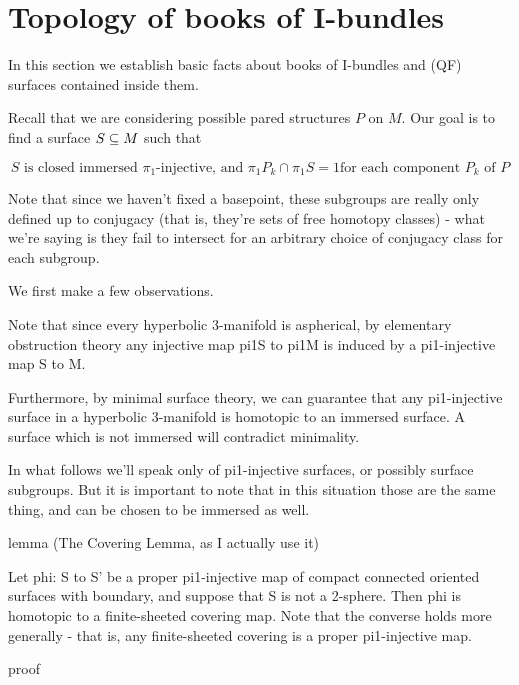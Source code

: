 \section{Topology of books of I-bundles}

In this section we establish basic facts about books of I-bundles and (QF)
surfaces contained inside them.

Recall that we are considering possible pared structures $P$ on $M$. Our goal
is to find a surface $S \subseteq M$ such that

\begin{equation}\label{E:qf}
S \text{ is closed immersed $\pi_1$-injective, and $\pi_1P_k \cap \pi_1S = 1$
for each component $P_k$ of $P$} \tag{QF}
\end{equation}

Note that since we haven't fixed a basepoint, these subgroups are really only
defined up to conjugacy (that is, they're sets of free homotopy classes) - what
we're saying is they fail to intersect for an arbitrary choice of conjugacy
class for each subgroup.

We first make a few observations.

Note that since every hyperbolic 3-manifold is aspherical, by elementary
obstruction theory any injective map pi1S to pi1M is induced by a pi1-injective
map S to M.

Furthermore, by minimal surface theory, we can guarantee that any pi1-injective
surface in a hyperbolic 3-manifold is homotopic to an immersed surface.
A surface which is not immersed will contradict minimality.

In what follows we'll speak only of pi1-injective surfaces, or possibly surface
subgroups. But it is important to note that in this situation those are the
same thing, and can be chosen to be immersed as well.

lemma (The Covering Lemma, as I actually use it)

Let phi: S to S' be a proper pi1-injective map of compact connected oriented
surfaces with boundary, and suppose that S is not a 2-sphere.  Then phi is
homotopic to a finite-sheeted covering map.  Note that the converse holds more
generally - that is, any finite-sheeted covering is a proper pi1-injective map.

proof

